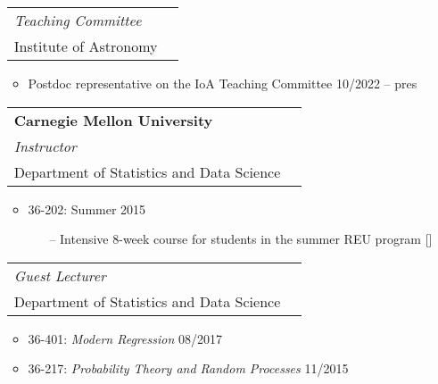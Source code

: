 \documentclass[letterpaper,10pt]{extarticle}
\makeatletter
\newcommand{\myhref}[3][blue]{\href{#2}{\color{#1}{#3}}}
\newcommand{\subheadingtwolines}[4]{
\begin{tabular*}{6.55in}{l@{\cftdotfill{\cftsecdotsep}\extracolsep{\fill}}r}
#1 & #2 \\
#3 & #4 \\
\end{tabular*}}
\newcommand{\subheadingthreelines}[6]{
\begin{tabular*}{6.55in}{l@{\cftdotfill{\cftsecdotsep}\extracolsep{\fill}}r}
#1 & #2 \\
#3 & #4 \\
#5 & #6 \\
\end{tabular*}}
\makeatother
\begin{document}
\begin{itemize}[leftmargin=0.4cm, rightmargin=0cm]
\item[] \hspace{-2ex}\subheadingtwolines{\it Teaching Committee}{}{Institute of Astronomy}{} \hfill
\vspace{-0.3cm}
\begin{itemize}[leftmargin=0.4cm, rightmargin=0cm]
\item Postdoc representative on the IoA Teaching Committee \hfill 10/2022 -- pres
\end{itemize}
\end{itemize}

\vspace{-0.15cm}

\begin{itemize}[leftmargin=0.4cm]
\item[] \hspace{-2ex}\subheadingthreelines{\bf Carnegie Mellon University}{}{{\it Instructor}}{}{Department of Statistics and Data Science}{}
\vspace{-0.15cm}
\begin{itemize}[leftmargin=0.4cm, rightmargin=0cm]
\item 36-202: \hspace{5.9ex}{\it Methods for Statistics \& Data Science} \hfill Summer 2015
\vspace{0.1cm}
\begin{itemize}
\item[--] Intensive 8-week course for students in the summer REU program [\myhref{https://www.stat.cmu.edu/summer/}{Link}]
\end{itemize}
\end{itemize}

\vspace{0.075cm}

\item[] \hspace{-2ex}\subheadingtwolines{\it Guest Lecturer}{}{Department of Statistics and Data Science}{}
\vspace{-0.2cm}
\begin{itemize}[leftmargin=0.4cm, rightmargin=0cm]
\item 36-401: \hspace{5.9ex}\emph{Modern Regression} \hfill 08/2017
\item 36-217: \hspace{5.9ex}\emph{Probability Theory and Random Processes} \hfill 11/2015
\end{itemize}


\end{itemize}
\end{document}
